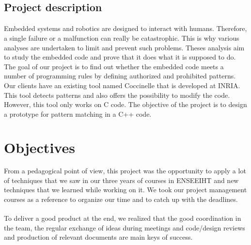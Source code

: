 \documentclass{report}
\begin{document}
\subsection{Project description}

\paragraph{}
\hspace{4mm}\textnormal{Embedded systems and robotics are designed to interact 
with humans. Therefore, a single failure or a malfunction can 
really be catastrophic. This is why various analyses are undertaken
 to limit and prevent such problems. Theses analysis aim to study 
the embedded code and prove that it does what it is supposed to 
do. The goal of our project is to find out whether the embedded 
code meets a number of programming rules by defining authorized
 and prohibited patterns. Our clients have an existing tool named 
Coccinelle that is developed at INRIA. This tool detects patterns 
and also offers the possibility to modify the code. However, this 
tool only works on C code. The objective of the project is to design 
a prototype for pattern matching in a C++ code.}

\section{Objectives}

\paragraph{}
\hspace{4mm}\textnormal{From a pedagogical point of view, this project was the 
opportunity to apply a lot of techniques that we saw in our three 
years of courses in ENSEEIHT and new techniques that we learned
while working on it. We took our project management courses as a reference to 
organize our time and to catch up with the deadlines. 
}

\paragraph{}
\hspace{4mm}\textnormal{To deliver a good product at the end, we realized that the good coordination
in the team, the regular exchange of ideas during meetings and code/design reviews
and production of relevant documents are main keys of success.}
\end{document}
